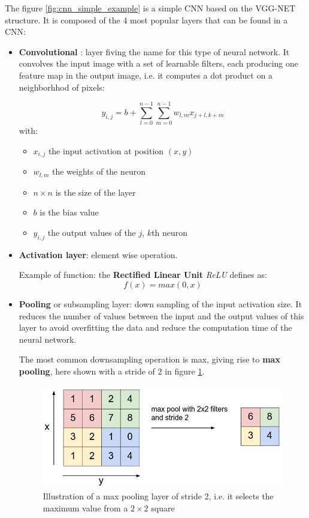The figure \ref{fig:cnn_simple_example} is a simple CNN based on the VGG-NET structure. It is composed of the 4 most popular layers that can be found in a CNN:
\begin{itemize}
    \item \textbf{Convolutional} : layer fiving the name for this type of neural network. It convolves the input image with a set of learnable filters, each producing one feature map in the output image, i.e. it computes a dot product on a neighborhhod of pixels:
    
    $$ y_{i, j} = b + \sum_{l=0}^{n - 1} \sum_{m=0}^{n - 1}  w_{l,m} x_{j+l, k+m} $$
    with:
    \begin{itemize}
        \item $x_{i,j}$ the input activation at position $(x, y)$
        \item $w_{l, m}$ the weights of the neuron
        \item $n \times n$ is the size of the layer
        \item $b$ is the bias value
        \item $y_{i, j}$ the output values of the $j$, $k$th neuron
    \end{itemize}
    
    \item \textbf{Activation layer}: element wise operation.
    
    Example of function: the \textbf{Rectified Linear Unit} \textit{ReLU} defines as:
    $$ f(x) = max(0, x)$$
   
    \item \textbf{Pooling} or subsampling layer: down sampling of the input activation size. It reduces the number of values between the input and the output values of this layer to avoid overfitting the data and reduce the computation time of the neural network.
    
    The most common downsampling operation is max, giving rise to \textbf{max pooling}, here shown with a stride of 2 in figure \ref{fig:max_pooling}.
    
    \begin{figure}[h]
        \includegraphics[scale=0.5]{img/max_pooling.jpeg}
        \caption[Illustration of a max pooling layer of stride 2]{Illustration of a max pooling layer of stride 2, i.e. it selects the maximum value from a $2 \times 2$ square}
        \label{fig:max_pooling}
    \end{figure}
    

\end{itemize}
